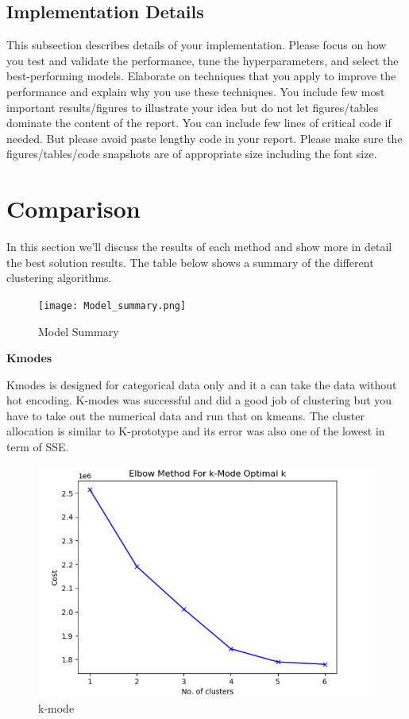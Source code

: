 \documentclass[conference]{IEEEtran}
\begin{document}
\subsection{Implementation Details}
This subsection describes details of your implementation. Please focus on how you test and validate the performance, tune the hyperparameters, and select the best-performing models. Elaborate on techniques that you apply to improve the performance and explain why you use these techniques. You include few most important results/figures to illustrate your idea but do not let figures/tables dominate the content of the report. You can include few lines of critical code if needed. But please avoid paste lengthy code in your report. Please make sure the figures/tables/code snapshots are of appropriate size including the font size.


\section{Comparison}  
In this section we'll discuss the results of each method and show more in detail the best solution results.  The table below shows a summary of the different clustering algorithms.
\begin{figure}[!h]
	\texttt{[image: Model\_summary.png]}
	\caption{Model Summary}
	\label{fig: Model_summary}
\end{figure}
\begin{center} 
\textbf{Kmodes} 
\end{center}
Kmodes is designed for categorical data only and it a can take the data without hot encoding.  K-modes was successful and did a good job of clustering but you have to take out the numerical data and run that on kmeans.  The cluster allocation is similar to K-prototype and its error was also one of the lowest in term of SSE.

\begin{figure}[!h]
	\includegraphics[width=\linewidth]{k_mode_elbow.png}
	\caption{k-mode}
	\label{fig: Kmode Elbow Chart}
 \end{figure}
\end{document}
